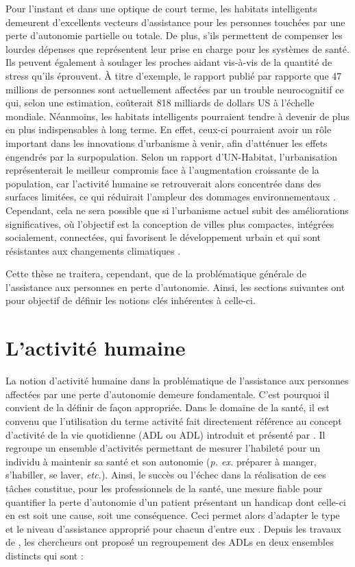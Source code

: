 Pour l’instant et dans une optique de court terme, les habitats intelligents demeurent d’excellents vecteurs d’assistance pour les personnes touchées par une perte d’autonomie partielle ou totale. De plus, s'ils permettent de compenser les lourdes dépenses que représentent leur prise en charge pour les systèmes de santé. Ils peuvent également à soulager les proches aidant vis-à-vis de la quantité de stress qu’ils éprouvent. À titre d'exemple, le rapport publié par \cite{Prince2016} rapporte que 47 millions de personnes sont actuellement affectées par un trouble neurocognitif ce qui, selon une estimation, coûterait 818 milliards de dollars US à l'échelle mondiale. Néanmoins, les habitats intelligents pourraient tendre à devenir de plus en plus indispensables à long terme. En effet, ceux-ci pourraient avoir un rôle important dans les innovations d’urbanisme à venir, afin d’atténuer les effets engendrés par la surpopulation. Selon un rapport d’UN-Habitat, l’urbanisation représenterait le meilleur compromis face à l’augmentation croissante de la population, car l’activité humaine se retrouverait alors concentrée dans des surfaces limitées, ce qui réduirait l’ampleur des dommages environnementaux \citep{UNFPA2007}. Cependant, cela ne sera possible que si l’urbanisme actuel subit des améliorations significatives, où l’objectif est la conception de villes plus compactes, intégrées socialement, connectées, qui favorisent le développement urbain et qui sont résistantes aux changements climatiques \citep{UNFPA2007}.

Cette thèse ne traitera, cependant, que de la problématique générale de l'assistance aux personnes en perte d'autonomie. Ainsi, les sections suivantes ont pour objectif de définir les notions clés inhérentes à celle-ci.

\section{L'activité humaine}

La notion d'activité humaine dans la problématique de l'assistance aux personnes affectées par une perte d'autonomie demeure fondamentale. C'est pourquoi il convient de la définir de façon appropriée. Dans le domaine de la santé, il est convenu que l'utilisation du terme activité fait directement référence au concept d'activité de la vie quotidienne (\acl{ADL} ou \acs{ADL}) introduit et présenté par \cite{Katz1963}. Il regroupe un ensemble d'activités permettant de mesurer l'habileté pour un individu à maintenir sa santé et son autonomie (\textit{p. ex.} préparer à manger, s'habiller, se laver, \textit{etc.}). Ainsi, le succès ou l'échec dans la réalisation de ces tâches constitue, pour les professionnels de la santé, une mesure fiable pour quantifier la perte d'autonomie d'un patient présentant un handicap dont celle-ci en est soit une cause, soit une conséquence. Ceci permet alors d'adapter le type et le niveau d'assistance approprié pour chacun d'entre eux \citep{Giovannetti2002}. Depuis les travaux de \cite{Katz1963}, les chercheurs \cite{Lawton1969} ont proposé un regroupement des \acsp{ADL} en deux ensembles distincts qui sont :

